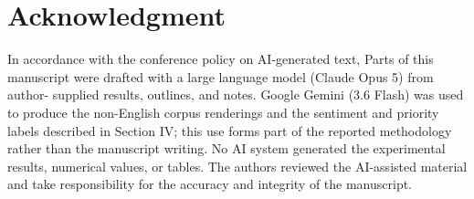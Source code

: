 %
%

\section*{Acknowledgment}
In accordance with the conference policy on AI-generated
text, Parts of this manuscript were drafted with a large language
model (Claude Opus 5) from author-
supplied results, outlines, and notes. Google Gemini (3.6
Flash) was used to produce the non-English corpus renderings
and the sentiment and priority labels described in Section IV;
this use forms part of the reported methodology rather than the
manuscript writing. No AI system generated the experimental
results, numerical values, or tables. The authors reviewed the
AI-assisted material and take responsibility for the accuracy
and integrity of the manuscript.